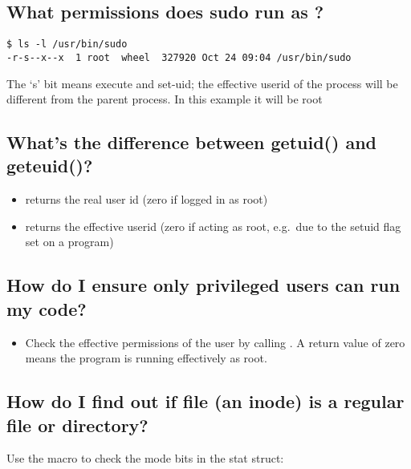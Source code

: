 \subsection{What permissions does sudo run as ?}\label{what-permissions-does-sudo-run-as}

\begin{lstlisting}
$ ls -l /usr/bin/sudo
-r-s--x--x  1 root  wheel  327920 Oct 24 09:04 /usr/bin/sudo
\end{lstlisting}

The `s' bit means execute and set-uid; the effective userid of the process will be different from the parent process. In this example it will be root

\subsection{What's the difference between getuid() and geteuid()?}\label{whats-the-difference-between-getuid-and-geteuid}

\begin{itemize}
\tightlist
\item
   returns the real user id (zero if logged in as root)
\item
   returns the effective userid (zero if acting as root, e.g.~due to the setuid flag set on a program)
\end{itemize}

\subsection{How do I ensure only privileged users can run my code?}\label{how-do-i-ensure-only-privileged-users-can-run-my-code}

\begin{itemize}
\tightlist
\item
  Check the effective permissions of the user by calling . A return value of zero means the program is running effectively as root.
\end{itemize}

\subsection{How do I find out if file (an inode) is a regular file or directory?}\label{how-do-i-find-out-if-file-an-inode-is-a-regular-file-or-directory}

Use the  macro to check the mode bits in the stat struct:


